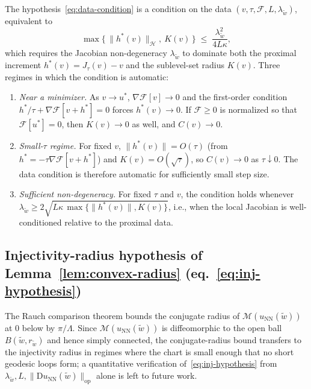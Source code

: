 \documentclass[twoside,11pt]{article}
\newcommand{\D}{\mathrm{D}}
\newcommand{\NN}{\mathrm{NN}}
\newcommand{\calF}{\mathcal{F}}
\newcommand{\calH}{\mathcal{H}}
\newcommand{\calM}{\mathcal{M}}
\begin{document}
\begin{remark}\label{rem:data-condition}
The hypothesis~\eqref{eq:data-condition} is a condition on the data $(v,\tau,\calF,L,\lambda_{\tilde w})$, equivalent to
\[
\max\!\bigl\{\,\|h^*(v)\|_\calH,\ K(v)\,\bigr\}\;\le\;\frac{\lambda_{\tilde w}^{2}}{4L\kappa},
\]
which requires the Jacobian non-degeneracy $\lambda_{\tilde w}$ to dominate both the proximal increment $h^*(v)=J_\tau(v)-v$ and the sublevel-set radius $K(v)$. Three regimes in which the condition is automatic:
\begin{enumerate}[label=(\roman*),leftmargin=*,nosep]
\item \emph{Near a minimizer.} As $v\to u^*$, $\nabla\calF[v]\to 0$ and the first-order condition $h^*/\tau+\nabla\calF[v+h^*]=0$ forces $h^*(v)\to 0$. If $\calF\ge 0$ is normalized so that $\calF[u^*]=0$, then $K(v)\to 0$ as well, and $C(v)\to 0$.
\item \emph{Small-$\tau$ regime.} For fixed $v$, $\|h^*(v)\|=O(\tau)$ (from $h^*=-\tau\nabla\calF[v+h^*]$) and $K(v)=O(\sqrt{\tau})$, so $C(v)\to 0$ as $\tau\downarrow 0$. The data condition is therefore automatic for sufficiently small step size.
\item \emph{Sufficient non-degeneracy.} For fixed $\tau$ and $v$, the condition holds whenever $\lambda_{\tilde w}\ge 2\sqrt{L\kappa\,\max\{\|h^*(v)\|,K(v)\}}$, i.e., when the local Jacobian is well-conditioned relative to the proximal data.
\end{enumerate}
\end{remark}

\subsection{Injectivity-radius hypothesis of Lemma~\ref{lem:convex-radius} (eq.~\eqref{eq:inj-hypothesis})}\label{app:disc-inj-radius}

\begin{remark}\label{rem:inj-hypothesis}
The Rauch comparison theorem \citep[Theorem~1.34]{cheeger2008comparison} bounds the conjugate radius of $\calM(u_\NN(\tilde w))$ at $0$ below by $\pi/\Lambda$. Since $\calM(u_\NN(\tilde w))$ is diffeomorphic to the open ball $B(\tilde w,r_{\tilde w})$ and hence simply connected, the conjugate-radius bound transfers to the injectivity radius in regimes where the chart is small enough that no short geodesic loops form; a quantitative verification of~\eqref{eq:inj-hypothesis} from $\lambda_{\tilde w}, L, \|\D u_\NN(\tilde w)\|_{\mathrm{op}}$ alone is left to future work.
\end{remark}
\end{document}

